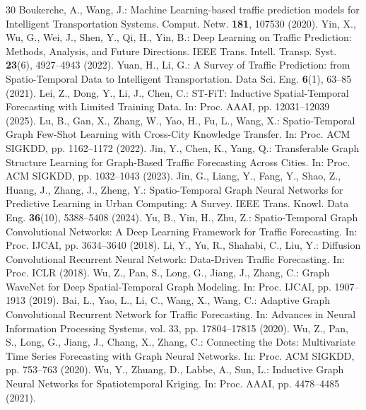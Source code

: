 \documentclass[runningheads,a4paper]{llncs}
\begin{document}
\begin{thebibliography}{30}
 Boukerche, A., Wang, J.: Machine Learning-based traffic prediction models for Intelligent Transportation Systems. Comput. Netw. \textbf{181}, 107530 (2020).
 Yin, X., Wu, G., Wei, J., Shen, Y., Qi, H., Yin, B.: Deep Learning on Traffic Prediction: Methods, Analysis, and Future Directions. IEEE Trans. Intell. Transp. Syst. \textbf{23}(6), 4927--4943 (2022).
 Yuan, H., Li, G.: A Survey of Traffic Prediction: from Spatio-Temporal Data to Intelligent Transportation. Data Sci. Eng. \textbf{6}(1), 63--85 (2021). %
 Lei, Z., Dong, Y., Li, J., Chen, C.: ST-FiT: Inductive Spatial-Temporal Forecasting with Limited Training Data. In: Proc. AAAI, pp. 12031--12039 (2025).
 Lu, B., Gan, X., Zhang, W., Yao, H., Fu, L., Wang, X.: Spatio-Temporal Graph Few-Shot Learning with Cross-City Knowledge Transfer. In: Proc. ACM SIGKDD, pp. 1162--1172 (2022). 
 Jin, Y., Chen, K., Yang, Q.: Transferable Graph Structure Learning for Graph-Based Traffic Forecasting Across Cities. In: Proc. ACM SIGKDD, pp. 1032--1043 (2023).
 Jin, G., Liang, Y., Fang, Y., Shao, Z., Huang, J., Zhang, J., Zheng, Y.: Spatio-Temporal Graph Neural Networks for Predictive Learning in Urban Computing: A Survey. IEEE Trans. Knowl. Data Eng. \textbf{36}(10), 5388--5408 (2024). 
 Yu, B., Yin, H., Zhu, Z.: Spatio-Temporal Graph Convolutional Networks: A Deep Learning Framework for Traffic Forecasting. In: Proc. IJCAI, pp. 3634--3640 (2018). 
 Li, Y., Yu, R., Shahabi, C., Liu, Y.: Diffusion Convolutional Recurrent Neural Network: Data-Driven Traffic Forecasting. In: Proc. ICLR (2018).
 Wu, Z., Pan, S., Long, G., Jiang, J., Zhang, C.: Graph WaveNet for Deep Spatial-Temporal Graph Modeling. In: Proc. IJCAI, pp. 1907--1913 (2019). 
 Bai, L., Yao, L., Li, C., Wang, X., Wang, C.: Adaptive Graph Convolutional Recurrent Network for Traffic Forecasting. In: Advances in Neural Information Processing Systems, vol. 33, pp. 17804--17815 (2020).
 Wu, Z., Pan, S., Long, G., Jiang, J., Chang, X., Zhang, C.: Connecting the Dots: Multivariate Time Series Forecasting with Graph Neural Networks. In: Proc. ACM SIGKDD, pp. 753--763 (2020). 
 Wu, Y., Zhuang, D., Labbe, A., Sun, L.: Inductive Graph Neural Networks for Spatiotemporal Kriging. In: Proc. AAAI, pp. 4478--4485 (2021). 

\end{thebibliography}
\end{document}

